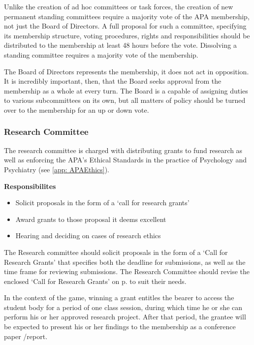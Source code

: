 \begin{refsection}
Unlike the creation of ad hoc committees or task forces, the creation of new permanent standing committees require a majority vote of the APA membership, not just the Board of Directors. A full proposal for such a committee, specifying its membership structure, voting procedures, rights and responsibilities should be distributed to the membership at least 48 hours before the vote. Dissolving a standing committee requires a majority vote of the membership.

The Board of Directors represents the membership, it does not act in opposition. It is incredibly important, then, that the Board seeks approval from the membership as a whole at every turn. The Board is a capable of assigning duties to various subcommittees on its own, but all matters of policy should be turned over to the membership for an up or down vote.

\newpage

\subsubsection{Research Committee}
\label{researchcommittee}

The research committee is charged with distributing grants to fund research as well as enforcing the APA's Ethical Standards in the practice of Psychology and Psychiatry (see \ref{app: APAEthics}).

\textbf{Responsibilites}

\begin{itemize}
\item Solicit proposals in the form of a `call for research grants'

\item Award grants to those proposal it deems excellent

\item Hearing and deciding on cases of research ethics

\end{itemize}

The Research committee should solicit proposals in the form of a `Call for Research Grants' that specifies both the deadline for submissions, as well as the time frame for reviewing submissions. The Research Committee should revise the enclosed `Call for Research Grants' on p. \pageref{callforresearchgrants} to suit their needs.

In the context of the game, winning a grant entitles the bearer to access the student body for a period of one class session, during which time he or she can perform his or her approved research project. After that period, the grantee will be expected to present his or her findings to the membership as a conference paper \slash  report.


\end{refsection}
